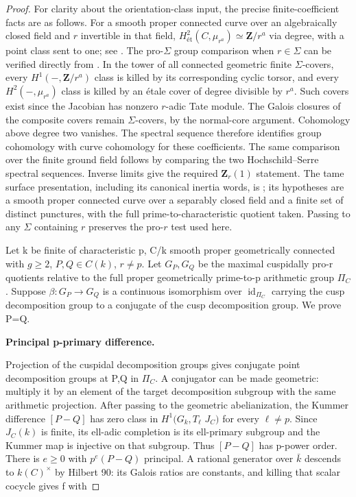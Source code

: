 \documentclass[11pt,a4paper]{article}
\newcommand{\et}{\text{ét}}
\begin{document}
\begin{proof}

For clarity about the orientation-class input, the precise finite-coefficient
facts are as follows. For a smooth proper connected curve over an
algebraically closed field and \(r\) invertible in that field,
\(H^2_{\et}(C,\mu_{r^a})\simeq\mathbf Z/r^a\) via degree, with a point
class sent to one; see \cite[Proposition 14.2 and Theorem 24.1(a)]{MilneEtale}.
The pro-\(\Sigma\) group comparison when \(r\in\Sigma\) can be verified
directly from \cite[Theorem 14.9 and Remark 14.10]{MilneEtale}.
In the tower of all connected geometric finite \(\Sigma\)-covers,
every \(H^1(-,\mathbf Z/r^a)\) class is killed by its corresponding
cyclic torsor, and every \(H^2(-,\mu_{r^a})\) class is killed by an
étale cover of degree divisible by \(r^a\). Such covers exist since
the Jacobian has nonzero \(r\)-adic Tate module. The Galois closures of
the composite covers remain \(\Sigma\)-covers, by the normal-core
argument. Cohomology above degree two vanishes. The spectral sequence
therefore identifies group cohomology with curve cohomology for these
coefficients. The same comparison over the finite ground field follows
by comparing the two Hochschild--Serre spectral sequences.
Inverse limits give the required \(\mathbf Z_r(1)\) statement.
The tame surface presentation, including its canonical inertia words,
is \cite[Expos\'{e} XIII, Corollary 2.12]{LA_SGA1}; its hypotheses are a
smooth proper connected curve over a separably closed field and a
finite set of distinct punctures, with the full prime-to-characteristic
quotient taken. Passing to any \(\Sigma\) containing \(r\) preserves the
pro-\(r\) test used here.

Let k be finite of characteristic p, C/k smooth proper geometrically connected with \(g{\ge}2\), \(P,Q{\in}C(k)\), \(r{\ne}p\). Let \(G_P,G_Q\) be the maximal cuspidally pro-r quotients relative to the full proper geometrically prime-to-p arithmetic group \({\Pi}_C\). Suppose \({\beta}:G_P{\to}G_Q\) is a continuous isomorphism over \(\operatorname{id}_{{\Pi}_C}\) carrying the cusp decomposition group to a conjugate of the cusp decomposition group. We prove P=Q.

\textbf{Principal p-primary difference.}

Projection of the cuspidal decomposition groups gives conjugate point decomposition groups at P,Q in \({\Pi}_C\). A conjugator can be made geometric: multiply it by an element of the target decomposition subgroup with the same arithmetic projection. After passing to the geometric abelianization, the Kummer difference \([P-Q]\) has zero class in \(H^1(G_k,T_\ell\) \(J_C)\) for every \(\ell{\ne}p\). Since \(J_C(k)\) is finite, its ell-adic completion is its ell-primary subgroup and the Kummer map is injective on that subgroup. Thus \([P-Q]\) has p-power order. There is \(e{\ge}0\) with \(p^e(P-Q)\) principal. A rational generator over \(\bar k\) descends to \(k(C)^{\times}\) by Hilbert 90: its Galois ratios are constants, and killing that scalar cocycle gives f with


\end{proof}
\end{document}

